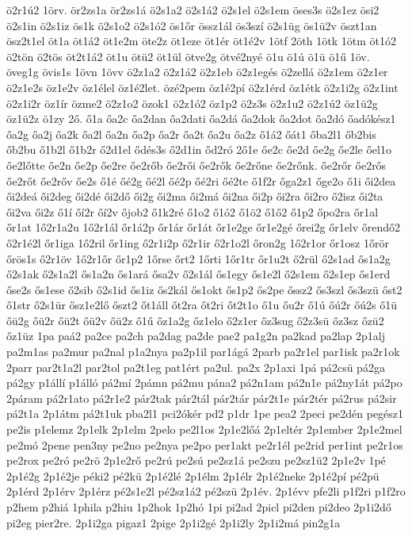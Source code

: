 {ö2r1ú2
1örv.
ör2zs1a
ör2zs1á
ö2s1a2
ö2s1á2
ö2s1el
ö2s1em
öses3s
ö2s1ez
ösi2
ö2s1in
ö2s1iz
ös1k
ö2s1o2
ö2s1ó2
ös1őr
össz1ál
ös3szí
ö2s1üg
ös1ü2v
öszt1an
ösz2t1el
öt1a
öt1á2
öt1e2m
öte2z
öt1eze
öt1ér
öt1é2v
1ötf
2öth
1ötk
1ötm
öt1ó2
ö2tön
ö2tös
öt2t1á2
öt1u
ötü2
öt1ül
ötve2g
ötvé2nyé
ö1u
ö1ú
ö1ü
ö1ű
1öv.
öveg1g
övis1s
1övn
1övv
ö2z1a2
ö2z1á2
ö2z1eb
ö2z1egés
ö2zellá
ö2z1em
ö2z1er
ö2z1e2s
öz1e2v
öz1élel
öz1é2let.
özé2pem
öz1é2pí
ö2z1érd
öz1étk
ö2z1i2g
ö2z1int
ö2z1i2r
öz1ír
özme2
ö2z1o2
özok1
ö2z1ó2
öz1p2
ö2z3s
ö2z1u2
ö2z1ú2
öz1ü2g
öz1ü2z
ö1zy
2ő.
ő1a
őa2c
őa2dan
őa2dati
őa2dá
őa2dok
őa2dot
őa2dó
őadókész1
őa2g
őa2j
őa2k
őa2l
őa2n
őa2p
őa2r
őa2t
őa2u
őa2z
ő1á2
őát1
őba2l1
őb2bis
őb2bu
ő1b2l
ő1b2r
ő2d1el
ődés3s
ő2d1in
őd2ró
2ő1e
őe2c
őe2d
őe2g
őe2le
őel1o
őe2lőtte
őe2n
őe2p
őe2re
őe2rőb
őe2rői
őe2rők
őe2rőne
őe2rőnk.
őe2rőr
őe2rős
őe2rőt
őe2rőv
őe2s
ő1é
őé2g
őé2l
őé2p
őé2ri
őé2te
ő1f2r
őga2z1
őge2o
ő1i
ői2dea
ői2deá
ői2deg
ői2dé
ői2dő
ői2g
ői2ma
ői2má
ői2na
ői2p
ői2ra
ői2ro
ő2isz
ői2ta
ői2va
ői2z
ő1í
őí2r
őí2v
őjob2
ő1k2ré
ő1o2
ő1ó2
ő1ö2
ő1ő2
ő1p2
őpo2ra
őr1al
őr1at
1ő2r1a2u
1ő2r1ál
őr1á2p
őr1ár
őr1át
őr1e2ge
őr1e2gé
őrei2g
őr1elv
őrendő2
ő2r1é2l
őr1iga
1ő2ril
őr1ing
ő2r1i2p
ő2r1ir
ő2r1o2l
őron2g
1ő2r1or
őr1osz
1őrör
őrös1s
ő2r1öv
1ő2r1őr
őr1p2
1őrse
őrt2
1őrti
1őr1tr
őr1u2t
ő2rül
ő2s1ad
ős1a2g
ő2s1ak
ő2s1a2l
ős1a2n
ős1ará
ősa2v
ő2s1ál
ős1egy
ős1e2l
ő2s1em
ő2s1ep
ős1erd
őse2s
ős1ese
ő2sib
ő2s1id
ős1iz
ős2kál
ős1okt
ős1p2
ős2pe
őssz2
ős3szl
ős3szü
őst2
ő1str
ő2s1ür
ősz1e2lő
őszt2
őt1áll
őt2ra
őt2ri
őt2t1o
ő1u
őu2r
ő1ú
őú2r
őú2s
ő1ü
őü2g
őü2r
őü2t
őü2v
őü2z
ő1ű
őz1a2g
őz1elo
ő2z1er
őz3sug
ő2z3sü
őz3sz
őzü2
őz1üz
1pa
paá2
pa2ce
pa2ch
pa2dag
pa2de
pae2
pa1g2n
pa2kad
pa2lap
2p1alj
pa2m1as
pa2mur
pa2nal
p1a2nya
pa2p1il
par1ágá
2parb
pa2r1el
par1isk
pa2r1ok
2parr
par2t1a2l
par2tol
pa2t1eg
pat1ért
pa2ul.
pa2x
2p1axi
1pá
pá2csü
pá2ga
pá2gy
p1állí
p1álló
pá2mí
2pámn
pá2mu
pána2
pá2n1am
pá2n1e
pá2ny1át
pá2po
2páram
pá2r1ato
pá2r1e2
pár2tak
pár2tál
pár2tár
pár2t1e
pár2tér
pá2rus
pá2sir
pá2t1a
2p1átm
pá2t1uk
pba2l1
pci2ókér
pd2
p1dr
1pe
pea2
2peci
pe2dén
pegész1
pe2is
p1elemz
2p1elk
2p1elm
2pelo
pe2l1os
2p1e2lőá
2p1eltér
2p1ember
2p1e2mel
pe2mó
2pene
pen3ny
pe2no
pe2nya
pe2po
per1akt
pe2r1él
pe2rid
per1int
pe2r1os
pe2rox
pe2ró
pe2rö
2p1e2rő
pe2rú
pe2sú
pe2sz1á
pe2szu
pe2sz1ü2
2p1e2v
1pé
2p1é2g
2p1é2je
péki2
pé2kü
2p1é2lé
2p1élm
2p1élr
2p1é2neke
2p1é2pí
pé2pü
2p1érd
2p1érv
2p1érz
pé2s1e2l
pé2sz1á2
pé2szü
2p1év.
2p1évv
pfe2li
p1f2ri
p1f2ro
p2hem
p2hiá
1phila
p2hiu
1p2hok
1p2hó
1pi
pi2ad
2picl
pi2den
pi2deo
2p1i2dő
pi2eg
pier2re.
2p1i2ga
pigaz1
2pige
2p1i2gé
2p1i2ly
2p1i2má
pin2g1a
}
